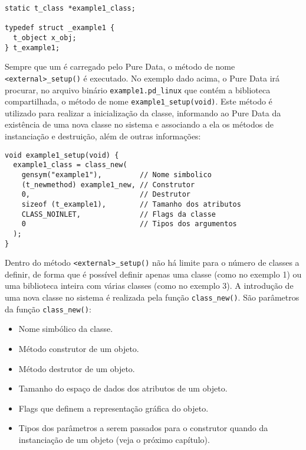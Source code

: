 \vspace{1em}
\begin{lstlisting}
static t_class *example1_class;

typedef struct _example1 {
  t_object x_obj;
} t_example1;
\end{lstlisting}

Sempre que um \external é carregado pelo Pure Data, o método de nome
\texttt{<external>\_setup()} é executado. No exemplo dado acima, o Pure
Data irá procurar, no arquivo binário \texttt{example1.pd\_linux} que contém
a biblioteca compartilhada, o método de nome \texttt{example1\_setup(void)}.
Este método é utilizado para realizar a inicialização da classe, informando ao
Pure Data da existência de uma nova classe no sistema e associando a ela os
métodos de instanciação e destruição, além de outras informações:

\vspace{1em}
\begin{lstlisting}
void example1_setup(void) {
  example1_class = class_new(
    gensym("example1"),         // Nome simbolico
    (t_newmethod) example1_new, // Construtor
    0,                          // Destrutor
    sizeof (t_example1),        // Tamanho dos atributos
    CLASS_NOINLET,              // Flags da classe
    0                           // Tipos dos argumentos
  );
}
\end{lstlisting}

Dentro do método \texttt{<external>\_setup()} não há limite para o número de
classes a definir, de forma que é possível definir apenas uma classe (como no
exemplo 1) ou uma biblioteca inteira com várias classes (como no exemplo 3).
A introdução de uma nova classe no sistema é realizada pela função
\texttt{class\_new()}. São parâmetros da função \texttt{class\_new()}:

\begin{itemize}
\item Nome simbólico da classe.
\item Método construtor de um objeto.
\item Método destrutor de um objeto.
\item Tamanho do espaço de dados dos atributos de um objeto.
\item Flags que definem a representação gráfica do objeto.
\item Tipos dos parâmetros a serem passados para o construtor quando da
      instanciação de um objeto (veja o próximo capítulo).
\end{itemize}

